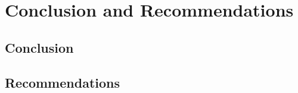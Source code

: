 
\chapter{Conclusion and Recommendations} %

\label{Chapter5} %

\section{Conclusion}


\section{Recommendations}


